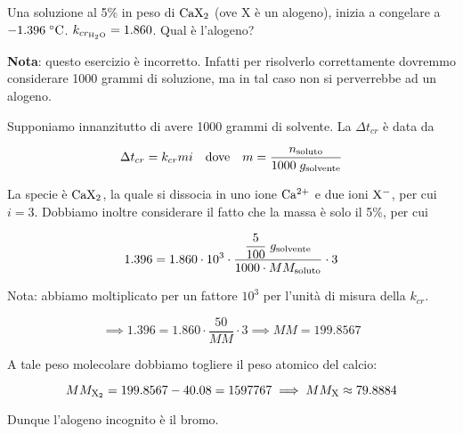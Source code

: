 \begin{esercizio}
    Una soluzione al 5\% in peso di $\rm CaX_2$ (ove X è un alogeno), inizia a congelare a $-1.396 \; \rm ^{\circ}C$. $k_{cr_{\rm H_2O}} = 1.860$. Qual è l'alogeno? 
\end{esercizio}
\begin{soluzione}
    \textbf{Nota}: questo esercizio è incorretto. Infatti per risolverlo correttamente dovremmo considerare 1000 grammi di soluzione, ma in tal caso non si perverrebbe ad un alogeno.

\vspace{0.2cm}Supponiamo innanzitutto di avere 1000 grammi di solvente. La $\Delta t_{cr}$ è data da

$$\Delta t_{cr}=k_{cr} m i
\quad\text{dove}\quad
m=\frac{n_{\rm soluto}}{1000\;g_{\rm solvente}}$$

La specie è $\rm CaX_2$, la quale si dissocia in uno ione $\rm Ca^{2+}$ e due ioni $\rm X^-$, per cui $i=3$. Dobbiamo inoltre considerare il fatto che la massa è solo il 5\%, per cui

$$1.396=1.860 \cdot 10^3 \cdot \frac{\displaystyle \frac{5}{100}\;g_{\rm solvente}}{1000 \cdot MM_{\rm soluto}} \cdot 3$$

Nota: abbiamo moltiplicato per un fattore $10^3$ per l'unità di misura della $k_{cr}$.

$$\implies
1.396=1.860 \cdot \frac{50}{MM} \cdot 3
\implies
MM=199.8567$$

A tale peso molecolare dobbiamo togliere il peso atomico del calcio:

$$MM_{\rm X_2}=199.8567-40.08=1597767
\implies
MM_{\rm X} \approx 79.8884$$

Dunque l'alogeno incognito è il bromo.

\end{soluzione}

\newpage

